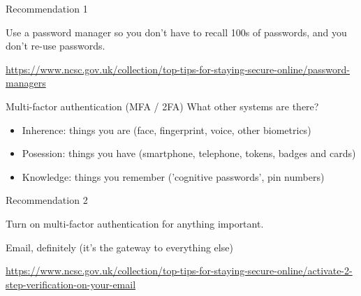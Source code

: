 \documentclass[xcolor=table]{beamer}
\begin{document}
	\begin{frame}{Recommendation 1}

		Use a password manager so you don't have to recall 100s of passwords, and you don't re-use passwords. 

		\vspace{0.5em}

		\url{https://www.ncsc.gov.uk/collection/top-tips-for-staying-secure-online/password-managers}
	\end{frame}
\begin{frame}{Multi-factor authentication (MFA / 2FA)}
	What other systems are there?
	\begin{itemize}
		\item Inherence: things you are (face, fingerprint, voice, other biometrics)
		\item Posession: things you have (smartphone, telephone, tokens, badges and cards)
		\item Knowledge: things you remember ('cognitive passwords', pin numbers)
	\end{itemize}
\end{frame}
	\begin{frame}{Recommendation 2}

Turn on multi-factor authentication for anything important. 

		\vspace{0.5em}

		Email, definitely (it's the gateway to everything else)


		\vspace{0.5em}

		\url{https://www.ncsc.gov.uk/collection/top-tips-for-staying-secure-online/activate-2-step-verification-on-your-email}
	\end{frame}
\end{document}
